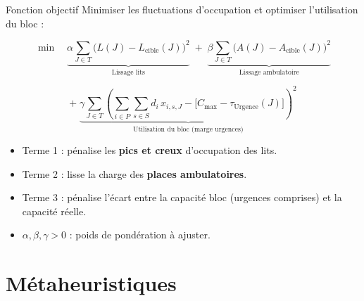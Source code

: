 \documentclass[aspectratio=169,11pt]{beamer}
\begin{document}
\begin{frame}{Fonction objectif}
  \small
  Minimiser les fluctuations d'occupation et optimiser l'utilisation du bloc :

  $$\min \quad \underbrace{\alpha \sum_{J \in T} \bigl(L(J) - L_{\text{cible}}(J)\bigr)^{\!2}}_{\text{Lissage lits}}
  \;+\; \underbrace{\beta \sum_{J \in T} \bigl(A(J) - A_{\text{cible}}(J)\bigr)^{\!2}}_{\text{Lissage ambulatoire}}$$

  $$+\; \underbrace{\gamma \sum_{J \in T} \left( \sum_{i \in P} \sum_{s \in S} d_i\, x_{i,s,J} - \bigl[C_{\max} - \tau_{\text{Urgence}}(J)\bigr] \right)^{\!2}}_{\text{Utilisation du bloc (marge urgences)}}$$

  \vspace{0.3em}
  \begin{itemize}
    \item Terme 1 : pénalise les \textbf{pics et creux} d'occupation des lits.
    \item Terme 2 : lisse la charge des \textbf{places ambulatoires}.
    \item Terme 3 : pénalise l'écart entre la capacité bloc (urgences comprises) et la capacité réelle.
    \item $\alpha, \beta, \gamma > 0$ : poids de pondération à ajuster.
  \end{itemize}
\end{frame}

\section{Métaheuristiques}
\end{document}

